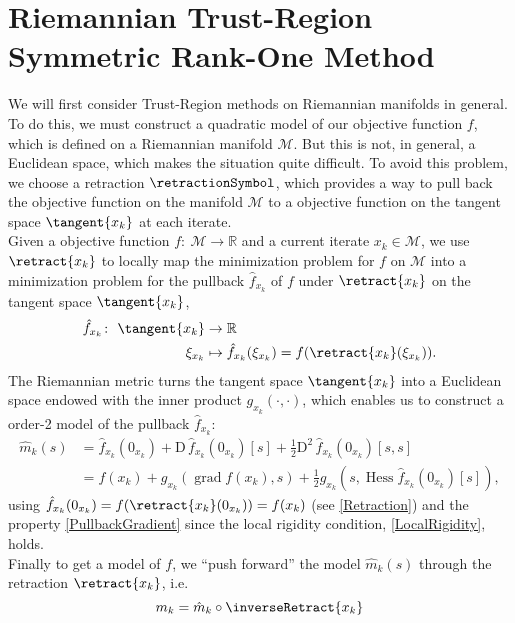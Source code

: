 \section{Riemannian Trust-Region Symmetric Rank-One Method}

We will first consider Trust-Region methods on Riemannian manifolds in general. To do this, we must construct a quadratic model of our objective function $f$, which is defined on a Riemannian manifold $\mathcal{M}$. But this is not, in general, a Euclidean space, which makes the situation quite difficult. To avoid this problem, we choose a retraction $\retractionSymbol$, which provides a way to pull back the objective function on the manifold $\mathcal{M}$ to a objective function on the tangent space $\tangent{x_k}$ at each iterate. \\
Given a objective function $f \colon \ \mathcal{M} \to \mathbb{R}$ and a current iterate $x_k \in \mathcal{M}$, we use $\retract{x_k}$ to locally map the minimization problem for $f$ on $\mathcal{M}$ into a minimization problem for the pullback $\hat{f}_{x_k}$ of $f$ under $\retract{x_k}$ on the tangent space $\tangent{x_k}$,
\begin{align*}
    \hat{f}_{x_k} \colon \ \tangent{x_k} & \to \mathbb{R} \\
    \xi_{x_k} & \mapsto \hat{f}_{x_k} (\xi_{x_k}) = f(\retract{x_k}(\xi_{x_k})).
\end{align*}
The Riemannian metric turns the tangent space $\tangent{x_k}$ into a Euclidean space endowed with the inner product $g_{x_k}(\cdot, \cdot)$, which enables us to construct a order-2 model of the pullback $\hat{f}_{x_k}$:
\begin{align*}
    \hat{m}_k( s ) & = \hat{f}_{x_k}(0_{x_k}) + \mathrm{D} \, \hat{f}_{x_k}(0_{x_k}) [s] + \frac{1}{2} \mathrm{D}^2 \, \hat{f}_{x_k}(0_{x_k}) [s, s] \\
    & = f(x_k) + g_{x_k}(\operatorname{grad} f(x_k), s ) + \frac{1}{2} g_{x_k}( s, \operatorname{Hess} \hat{f}_{x_k}(0_{x_k}) [s]),
\end{align*}
using $\hat{f}_{x_k}(0_{x_k}) = f(\retract{x_k}(0_{x_k})) = f(x_k)$ (see \cref{Retraction}) and the property \cref{PullbackGradient} since the local rigidity condition, \cref{LocalRigidity}, holds. \\
Finally to get a model of $f$, we “push forward” the model $\hat{m}_k(s)$ through the retraction $\retract{x_k}$, i.e.
\begin{equation}\label{RiemannianModel}
    m_k = \hat{m}_k \circ \inverseRetract{x_k}
\end{equation}
